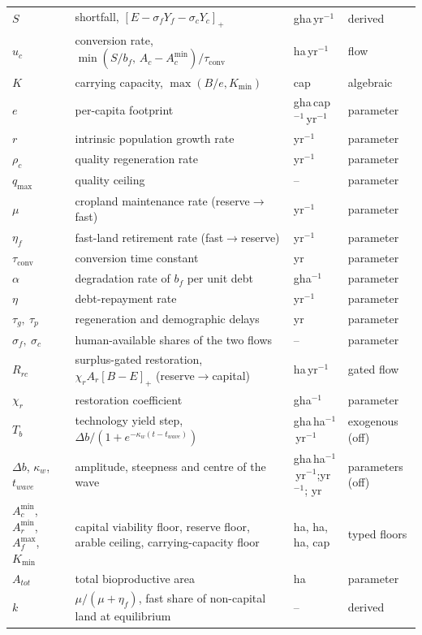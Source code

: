 \documentclass[11pt,a4paper]{article}
\newcommand{\pos}[1]{\left[#1\right]_+}
\newcommand{\Acmin}{A_c^{\min}}
\newcommand{\tconv}{\tau_{\mathrm{conv}}}
\begin{document}
\begin{longtable}{>{\raggedright\arraybackslash}p{}>{\raggedright\arraybackslash}p{}>{\raggedright\arraybackslash}p{}>{\raggedright\arraybackslash}p{}}
$S$ & shortfall, $\pos{E-\sigma_fY_f-\sigma_cY_c}$ & gha\,yr$^{-1}$ & derived \\
$u_c$ & conversion rate, $\min(S/b_f,\,A_c-\Acmin)/\tconv$ & ha\,yr$^{-1}$ & flow \\
$K$ & carrying capacity, $\max(B/e,K_{\min})$ & cap & algebraic \\
$e$ & per-capita footprint & gha\,cap$^{-1}$\,yr$^{-1}$ & parameter \\
$r$ & intrinsic population growth rate & yr$^{-1}$ & parameter \\
$\rho_c$ & quality regeneration rate & yr$^{-1}$ & parameter \\
$q_{\max}$ & quality ceiling & -- & parameter \\
$\mu$ & cropland maintenance rate (reserve$\to$fast) & yr$^{-1}$ & parameter \\
$\eta_f$ & fast-land retirement rate (fast$\to$reserve) & yr$^{-1}$ & parameter \\
$\tconv$ & conversion time constant & yr & parameter \\
$\alpha$ & degradation rate of $b_f$ per unit debt & gha$^{-1}$ & parameter \\
$\eta$ & debt-repayment rate & yr$^{-1}$ & parameter \\
$\tau_g,\ \tau_p$ & regeneration and demographic delays & yr & parameter \\
$\sigma_f,\ \sigma_c$ & human-available shares of the two flows & -- & parameter \\
$R_{rc}$ & surplus-gated restoration, $\chi_rA_r\pos{B-E}$ (reserve$\to$capital) & ha\,yr$^{-1}$ & gated flow \\
$\chi_r$ & restoration coefficient & gha$^{-1}$ & parameter \\
$T_b$ & technology yield step, $\Delta b/(1+e^{-\kappa_w(t-t_{wave})})$ & gha\,ha$^{-1}$\,yr$^{-1}$ & exogenous (off) \\
$\Delta b$, $\kappa_w$, $t_{wave}$ & amplitude, steepness and centre of the wave & gha\,ha$^{-1}$\,yr$^{-1}$;\newline yr$^{-1}$; yr & parameters (off) \\
$\Acmin$, $A_r^{\min}$, $A_f^{\max}$, $K_{\min}$ & capital viability floor, reserve floor, arable ceiling, carrying-capacity floor & ha, ha, ha, cap & typed floors \\
$A_{tot}$ & total bioproductive area & ha & parameter \\
$k$ & $\mu/(\mu+\eta_f)$, fast share of non-capital land at equilibrium & -- & derived \\

\end{longtable}
\end{document}
